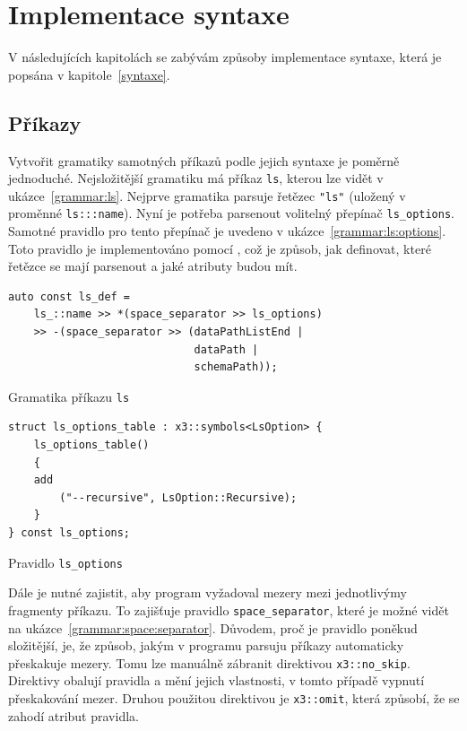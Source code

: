 \documentclass[thesis=B,czech,hidelinks]{FITthesis}[2019/03/06]
\begin{document}
\section{Implementace syntaxe}
V následujících kapitolách se zabývám způsoby implementace syntaxe, která je popsána v kapitole~\ref{syntaxe}.


\subsection{Příkazy}
Vytvořit gramatiky samotných příkazů podle jejich syntaxe je poměrně jednoduché. Nejsložitější gramatiku má příkaz \texttt{ls}, kterou lze vidět v ukázce~\ref{grammar:ls}. Nejprve gramatika parsuje řetězec \verb¨"ls"¨ (uložený v proměnné \verb¨ls:::name¨). Nyní je potřeba parsenout volitelný přepínač \verb¨ls_options¨. Samotné pravidlo pro tento přepínač je uvedeno v ukázce~\ref{grammar:ls:options}. Toto pravidlo je implementováno pomocí , což je způsob, jak definovat, které řetězce se mají parsenout a jaké atributy budou mít.

\begin{listing}
\begin{verbatim}
auto const ls_def =
    ls_::name >> *(space_separator >> ls_options)
    >> -(space_separator >> (dataPathListEnd |
                             dataPath |
                             schemaPath));
\end{verbatim}
\caption{Gramatika příkazu \texttt{ls}}\label{grammar:ls}
\end{listing}


\begin{listing}
\begin{verbatim}
struct ls_options_table : x3::symbols<LsOption> {
    ls_options_table()
    {
    add
        ("--recursive", LsOption::Recursive);
    }
} const ls_options;
\end{verbatim}
\caption{Pravidlo \texttt{ls\_options}}\label{grammar:ls:options}
\end{listing}

Dále je nutné zajistit, aby program vyžadoval mezery mezi jednotlivýmy fragmenty příkazu. To zajišťuje pravidlo \verb¨space_separator¨, které je možné vidět na ukázce~\ref{grammar:space:separator}. Důvodem, proč je pravidlo poněkud složitější, je, že způsob, jakým v programu parsuju příkazy automaticky přeskakuje mezery. Tomu lze manuálně zábranit direktivou \verb¨x3::no_skip¨. Direktivy obalují pravidla a mění jejich vlastnosti, v tomto případě vypnutí přeskakování mezer. Druhou použitou direktivou je \verb¨x3::omit¨, která způsobí, že se zahodí atribut pravidla.
\end{document}
